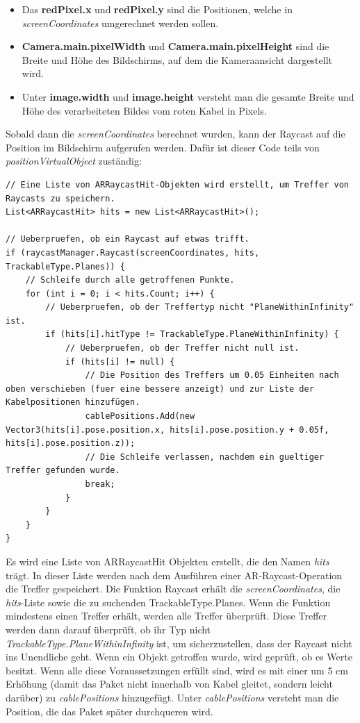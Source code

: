\begin{itemize}
    \item Das \textbf{redPixel.x} und \textbf{redPixel.y} sind die Positionen, welche in \textit{screenCoordinates} umgerechnet werden sollen.
    \item \textbf{Camera.main.pixelWidth} und \textbf{Camera.main.pixelHeight} sind die Breite und Höhe des Bildschirms, auf dem die Kameraansicht dargestellt wird.
    \item Unter \textbf{image.width} und \textbf{image.height} versteht man die gesamte Breite und Höhe des verarbeiteten Bildes vom roten Kabel in Pixels.
\end{itemize}
Sobald dann die \textit{screenCoordinates} berechnet wurden, kann der Raycast auf die Position im Bildschirm aufgerufen werden. Dafür ist dieser Code teils von \textit{positionVirtualObject} zuständig:
\begin{lstlisting}[style=csharp, caption={Raycast schießen}, label=code:createRaycast]
// Eine Liste von ARRaycastHit-Objekten wird erstellt, um Treffer von Raycasts zu speichern.
List<ARRaycastHit> hits = new List<ARRaycastHit>();

// Ueberpruefen, ob ein Raycast auf etwas trifft.
if (raycastManager.Raycast(screenCoordinates, hits, TrackableType.Planes)) {
    // Schleife durch alle getroffenen Punkte.
    for (int i = 0; i < hits.Count; i++) {
        // Ueberpruefen, ob der Treffertyp nicht "PlaneWithinInfinity" ist.
        if (hits[i].hitType != TrackableType.PlaneWithinInfinity) {
            // Ueberpruefen, ob der Treffer nicht null ist.
            if (hits[i] != null) {
                // Die Position des Treffers um 0.05 Einheiten nach oben verschieben (fuer eine bessere anzeigt) und zur Liste der Kabelpositionen hinzufügen.
                cablePositions.Add(new Vector3(hits[i].pose.position.x, hits[i].pose.position.y + 0.05f, hits[i].pose.position.z));
                // Die Schleife verlassen, nachdem ein gueltiger Treffer gefunden wurde.
                break;
            }
        }
    }
}

\end{lstlisting}
Es wird eine Liste von ARRaycastHit Objekten erstellt, die den Namen \textit{hits} trägt. In dieser Liste werden nach dem Ausführen einer AR-Raycast-Operation die Treffer gespeichert. Die Funktion Raycast erhält die \textit{screenCoordinates}, die \textit{hits}-Liste sowie die zu suchenden TrackableType.Planes.
Wenn die Funktion mindestens einen Treffer erhält, werden alle Treffer überprüft. Diese Treffer werden dann darauf überprüft, ob ihr Typ nicht \textit{TrackableType.PlaneWithinInfinity} ist, um sicherzustellen, dass der Raycast nicht ins Unendliche geht. Wenn ein Objekt getroffen wurde, wird geprüft, ob es Werte besitzt. Wenn alle diese Voraussetzungen erfüllt sind, wird es mit einer um 5 cm Erhöhung (damit das Paket nicht innerhalb von Kabel gleitet, sondern leicht darüber) zu \textit{cablePositions} hinzugefügt. Unter \textit{cablePositions} versteht man die Position, die das Paket später durchqueren wird.

